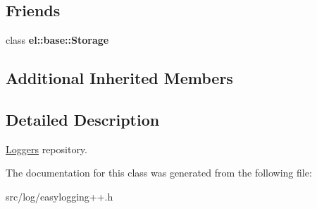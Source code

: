\subsection*{Friends}
\begin{DoxyCompactItemize}
\item 
class {\bfseries el\+::base\+::\+Storage}\hypertarget{classel_1_1base_1_1RegisteredLoggers_acc1efd1b8a3fc5e0028dab98b02e550a}{}\label{classel_1_1base_1_1RegisteredLoggers_acc1efd1b8a3fc5e0028dab98b02e550a}

\end{DoxyCompactItemize}
\subsection*{Additional Inherited Members}


\subsection{Detailed Description}
\hyperlink{classel_1_1Loggers}{Loggers} repository. 

The documentation for this class was generated from the following file\+:\begin{DoxyCompactItemize}
\item 
src/log/easylogging++.\+h\end{DoxyCompactItemize}
